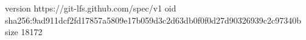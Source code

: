 version https://git-lfs.github.com/spec/v1
oid sha256:9ad911dcf2fd17857a5809e17b059d3c2d63db0f0f0d27d90326939c2c97340b
size 18172
